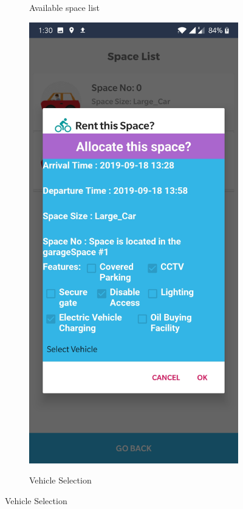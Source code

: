 \documentclass[12pt, english]{article}
\begin{document}
\begin{figure}[h!]
\begin{subfigure}[t]{0.3\textwidth}
        \label{arch50}
        \caption{Available space list}
    \end{subfigure}
    \begin{subfigure}[t]{0.3\textwidth}
    \includegraphics[width=\linewidth]{Location_Selection/select_vehicle_for_allocation.jpg}
        \label{arch50}
        \caption{Vehicle Selection}
    \end{subfigure}
    \label{fig:arp_os}
\end{figure}
\end{document}
